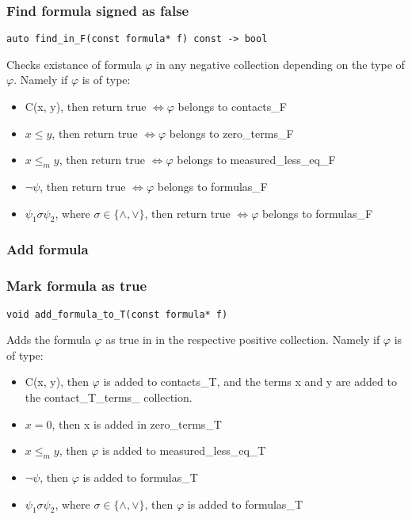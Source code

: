 \documentclass{article}
\begin{document}
            		\subsubsection*{Find formula signed as false}
                			\begin{lstlisting}
auto find_in_F(const formula* f) const -> bool
                			\end{lstlisting}
                			Checks existance of formula $\varphi$ in any negative collection depending on the type of $\varphi$.
				Namely if $\varphi$ is of type:
                			\begin{itemize}
                    				\item C(x, y), then return true $\iff \varphi$ belongs to contacts\_F
					\item $x \le y$, then return true $\iff \varphi$ belongs to zero\_terms\_F
					\item $x \le_m y$, then return true $\iff \varphi$ belongs to measured\_less\_eq\_F
					\item $\neg \psi$, then return true $\iff \varphi$ belongs to formulas\_F
                    				\item $\psi_1 \sigma \psi_2$, where $\sigma \in \{\wedge, \vee\}$, then return true $\iff \varphi$ belongs to formulas\_F
                			\end{itemize}
			\subsubsection*{Add formula}
			\subsubsection*{Mark formula as true}
				\begin{lstlisting}
void add_formula_to_T(const formula* f)
				\end{lstlisting}
				Adds the formula $\varphi$ as true in in the respective positive collection.
				Namely if $\varphi$ is of type:
				\begin{itemize}
					\item C(x, y), then $\varphi$ is added to contacts\_T, and the terms x and y are added to the contact\_T\_terms\_ collection.
					\item $x = 0$, then x is added in zero\_terms\_T
					\item $x \le_m y$, then $\varphi$ is added to measured\_less\_eq\_T
					\item $\neg \psi$, then $\varphi$ is added to formulas\_T
					\item $\psi_1 \sigma \psi_2$, where $\sigma \in \{\wedge, \vee\}$, then $\varphi$ is added to formulas\_T
				\end{itemize}
\end{document}
